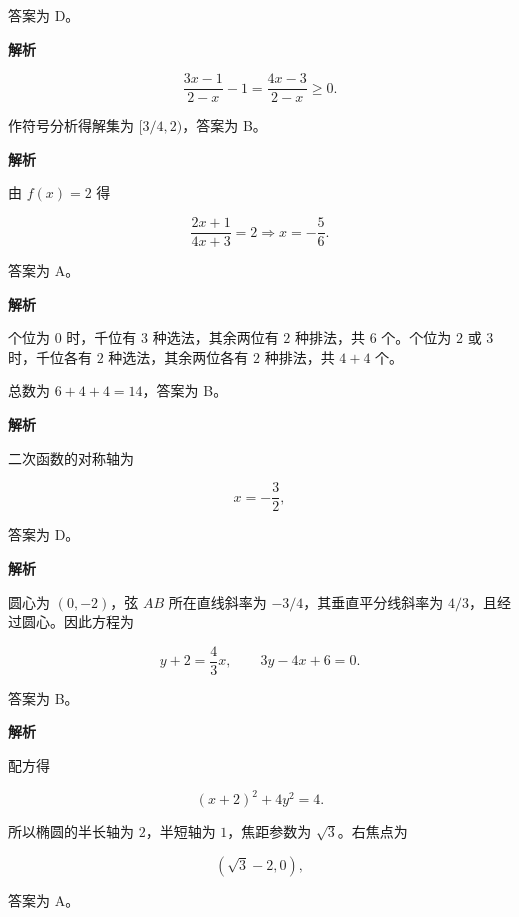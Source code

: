 \begin{answer}
答案为 D。


\textbf{解析}

\nopagebreak[4]
\[
\frac{3x-1}{2-x}-1=\frac{4x-3}{2-x}\ge0.
\]

作符号分析得解集为 $[3/4,2)$，答案为 B。


\textbf{解析}

由 $f(x)=2$ 得

\nopagebreak[4]
\[
\frac{2x+1}{4x+3}=2
\Longrightarrow x=-\frac56.
\]

答案为 A。


\textbf{解析}

个位为 $0$ 时，千位有 $3$ 种选法，其余两位有 $2$ 种排法，共 $6$ 个。个位为 $2$ 或 $3$ 时，千位各有 $2$ 种选法，其余两位各有 $2$ 种排法，共 $4+4$ 个。

总数为 $6+4+4=14$，答案为 B。


\textbf{解析}

二次函数的对称轴为

\nopagebreak[4]
\[
x=-\frac{3}{2},
\]

答案为 D。


\textbf{解析}

圆心为 $(0,-2)$，弦 $AB$ 所在直线斜率为 $-3/4$，其垂直平分线斜率为 $4/3$，且经过圆心。因此方程为

\nopagebreak[4]
\[
y+2=\frac43x,
\qquad
3y-4x+6=0.
\]

答案为 B。


\textbf{解析}

配方得

\nopagebreak[4]
\[
(x+2)^2+4y^2=4.
\]

所以椭圆的半长轴为 $2$，半短轴为 $1$，焦距参数为 $\sqrt3$。右焦点为

\nopagebreak[4]
\[
(\sqrt3-2,0),
\]

答案为 A。



\end{answer}
